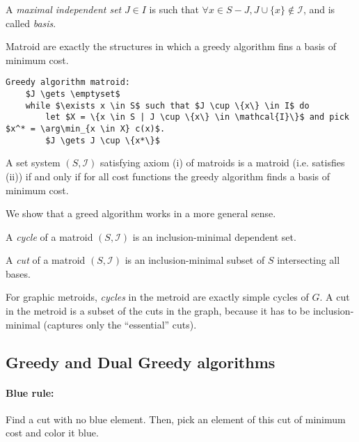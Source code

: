 \begin{mydefinition}
A \emph{maximal independent set} $J \in I$ is such that $\forall x \in S-J, J \cup \{x\} \notin \mathcal{I}$, and is called \emph{basis}.
\end{mydefinition}

Matroid are exactly the structures in which a greedy algorithm fins a basis of minimum cost.

\begin{lstlisting}[mathescape]
Greedy algorithm matroid:
    $J \gets \emptyset$
    while $\exists x \in S$ such that $J \cup \{x\} \in I$ do
        let $X = \{x \in S | J \cup \{x\} \in \mathcal{I}\}$ and pick $x^* = \arg\min_{x \in X} c(x)$.
        $J \gets J \cup \{x*\}$ 
\end{lstlisting}

\begin{mytheorem}
A set system $(S, \mathcal{I})$ satisfying axiom (i) of matroids is a matroid (i.e. satisfies (ii)) if and only if for all cost functions the greedy algorithm finds a basis
of minimum cost.
\end{mytheorem}

We show that a greed algorithm works in a more general sense.

\begin{mydefinition}
A \emph{cycle} of a matroid $(S, \mathcal{I})$ is an inclusion-minimal dependent set.
\end{mydefinition}

\begin{mydefinition}
A \emph{cut} of a matroid $(S, \mathcal{I})$ is an inclusion-minimal subset of $S$ intersecting all bases.
\end{mydefinition}

For graphic metroids, \emph{cycles} in the metroid are exactly simple cycles of $G$. A cut in the metroid is a subset of the cuts in the graph, because it has to be inclusion-minimal (captures only the ``essential'' cuts).

\subsection{Greedy and Dual Greedy algorithms}

\paragraph{Blue rule:} Find a cut with no blue element. Then, pick an element of this cut of minimum cost and color it blue.

